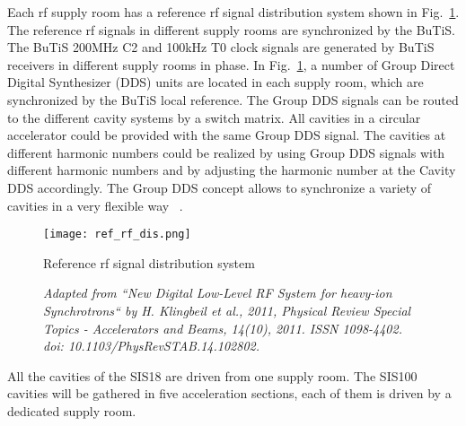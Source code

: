 Each rf supply room has a reference rf signal distribution system shown in Fig.~\ref{ref_rf_dis}. The reference rf signals in different supply rooms are synchronized by the BuTiS. The BuTiS 200MHz C2 and 100kHz T0 clock signals are generated by BuTiS receivers in different supply rooms in phase. In Fig.~\ref{ref_rf_dis}, a number of Group Direct Digital Synthesizer (DDS) units are located in each supply room, which are synchronized by the BuTiS local reference. The Group DDS signals can be routed to the different cavity systems by a switch matrix. All cavities in a circular accelerator could be provided with the same Group DDS signal. The cavities at different harmonic numbers could be realized by using Group DDS signals with different harmonic numbers and by adjusting the harmonic number at the Cavity DDS accordingly. The Group DDS concept allows to synchronize a variety of cavities in a very flexible way ~\cite{klingbeil_new_2011}. 
\begin{figure}[H]
   \centering   
   \texttt{[image: ref\_rf\_dis.png]}
   \caption{Reference rf signal distribution system}
   \caption*{\textsl{\small{Adapted from ``New Digital Low-Level RF System for heavy-ion Synchrotrons`` by H. Klingbeil et al., 2011, Physical Review Special Topics - Accelerators and Beams, 14(10), 2011. ISSN 1098-4402. doi: 10.1103/PhysRevSTAB.14.102802.}}}
   \label{ref_rf_dis}
\end{figure}

All the cavities of the SIS18 are driven from one supply room. The SIS100 cavities will be gathered in five acceleration sections, each of them is driven by a dedicated supply room. 

